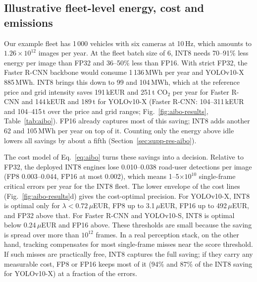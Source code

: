 \documentclass[pdflatex,sn-mathphys-num]{sn-jnl}%
\theoremstyle{thmstyleone}%
\theoremstyle{thmstyletwo}%
\theoremstyle{thmstylethree}%
\begin{document}
\subsection{Illustrative fleet-level energy, cost and emissions}\label{sec:res-aibo}
Our example fleet has 1\,000 vehicles with six cameras at 10\,Hz, which amounts to $1.26\times10^{12}$ images per year. At the fleet batch size of 6, INT8 needs 70--91\% less energy per image than FP32 and 36--50\% less than FP16. With strict FP32, the Faster R-CNN backbone would consume 1\,136\,MWh per year and YOLOv10-X 885\,MWh. INT8 brings this down to 99 and 104\,MWh, which at the reference price and grid intensity saves 191\,kEUR and 251\,t CO$_2$ per year for Faster R-CNN and 144\,kEUR and 189\,t for YOLOv10-X (Faster R-CNN: 104--311\,kEUR and 104--415\,t over the price and grid ranges; Fig.~\ref{fig:aibo-results}, Table~\ref{tab:aibo}). FP16 already captures most of this saving; INT8 adds another 62 and 105\,MWh per year on top of it. Counting only the energy above idle lowers all savings by about a fifth (Section~\ref{sec:supp-res-aibo}).

The cost model of Eq.~\eqref{eq:aibo} turns these savings into a decision. Relative to FP32, the deployed INT8 engines lose 0.010--0.038 road-user detections per image (FP8 0.003--0.044, FP16 at most 0.002), which means 1--5$\times10^{10}$ single-frame critical errors per year for the INT8 fleet. The lower envelope of the cost lines (Fig.~\ref{fig:aibo-results}d) gives the cost-optimal precision. For YOLOv10-X, INT8 is optimal only for $\lambda<0.72\,\mu$EUR, FP8 up to 3.1\,$\mu$EUR, FP16 up to 492\,$\mu$EUR, and FP32 above that. For Faster R-CNN and YOLOv10-S, INT8 is optimal below 0.24\,$\mu$EUR and FP16 above. These thresholds are small because the saving is spread over more than $10^{12}$ frames. In a real perception stack, on the other hand, tracking compensates for most single-frame misses near the score threshold. If such misses are practically free, INT8 captures the full saving; if they carry any measurable cost, FP8 or FP16 keeps most of it (94\% and 87\% of the INT8 saving for YOLOv10-X) at a fraction of the errors.

\end{document}
